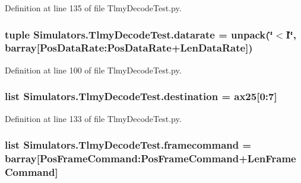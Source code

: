 Definition at line 135 of file Tlmy\+Decode\+Test.\+py.

\hypertarget{namespace_simulators_1_1_tlmy_decode_test_a01545a669b8eb1c263cbdcf170cb3ea9}{}
\subsubsection[{datarate}]{\setlength{\rightskip}{0pt plus 5cm}tuple Simulators.\+Tlmy\+Decode\+Test.\+datarate = unpack(\char`\"{}$<$I\char`\"{}, barray\mbox{[}Pos\+Data\+Rate\+:\+Pos\+Data\+Rate+{\bf Len\+Data\+Rate}\mbox{]})}\label{namespace_simulators_1_1_tlmy_decode_test_a01545a669b8eb1c263cbdcf170cb3ea9}


Definition at line 100 of file Tlmy\+Decode\+Test.\+py.

\hypertarget{namespace_simulators_1_1_tlmy_decode_test_a653c9f1e24a2181b6a8a5de654b8d012}{}
\subsubsection[{destination}]{\setlength{\rightskip}{0pt plus 5cm}list Simulators.\+Tlmy\+Decode\+Test.\+destination = {\bf ax25}\mbox{[}0\+:7\mbox{]}}\label{namespace_simulators_1_1_tlmy_decode_test_a653c9f1e24a2181b6a8a5de654b8d012}


Definition at line 133 of file Tlmy\+Decode\+Test.\+py.

\hypertarget{namespace_simulators_1_1_tlmy_decode_test_abc48100736864a5549e661b7bc91cd4a}{}
\subsubsection[{framecommand}]{\setlength{\rightskip}{0pt plus 5cm}list Simulators.\+Tlmy\+Decode\+Test.\+framecommand = {\bf barray}\mbox{[}Pos\+Frame\+Command\+:\+Pos\+Frame\+Command+{\bf Len\+Frame\+Command}\mbox{]}}\label{namespace_simulators_1_1_tlmy_decode_test_abc48100736864a5549e661b7bc91cd4a}


